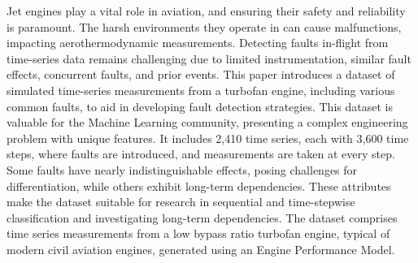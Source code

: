 \documentclass{ecai}
\begin{document}
Jet engines play a vital role in aviation, and ensuring their safety and reliability is paramount. The harsh environments they operate in can cause malfunctions, impacting aerothermodynamic measurements. Detecting faults in-flight from time-series data remains challenging due to limited instrumentation, similar fault effects, concurrent faults, and prior events. This paper introduces a dataset of simulated time-series measurements from a turbofan engine, including various common faults, to aid in developing fault detection strategies. This dataset is valuable for the Machine Learning community, presenting a complex engineering problem with unique features. It includes 2{,}410 time series, each with 3{,}600 time steps, where faults are introduced, and measurements are taken at every step. Some faults have nearly indistinguishable effects, posing challenges for differentiation, while others exhibit long-term dependencies. These attributes make the dataset suitable for research in sequential and time-stepwise classification and investigating long-term dependencies. The dataset comprises time series measurements from a low bypass ratio turbofan engine, typical of modern civil aviation engines, generated using an Engine Performance Model.


\end{document}
